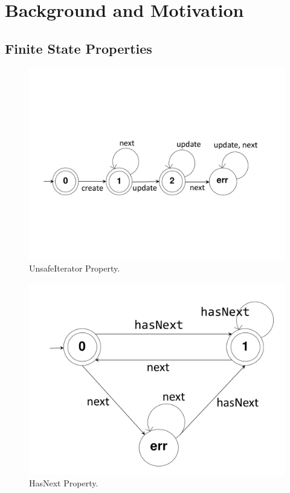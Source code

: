 \section{Background and Motivation}
\label{sec:motivation}


\subsection{Finite State Properties}
\label{sec:motivation:fsp}

\begin{figure}[t]
\centering
  \includegraphics[scale=0.3]{./images/unsafeiterator.pdf}
  \caption[UnsafeIterator Property FSA]{UnsafeIterator Property.}
  \label{fig:unsafeiteratorfsa}
\end{figure}

\begin{figure}[t]
\centering
  \includegraphics[trim=20cm 0cm 15cm 1cm, scale=0.2]{./images/HasNext.pdf}
  \caption[HasNext Property FSA]{HasNext Property.}
  \label{fig:hasnextfsa}
\end{figure}

